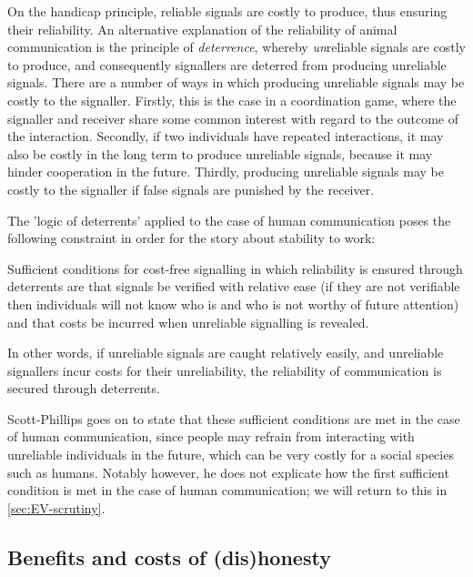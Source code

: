 On the handicap principle, reliable signals are costly to produce, thus ensuring their reliability. An alternative explanation of the reliability of animal communication is the principle of \emph{deterrence}, whereby \emph{un}reliable signals are costly to produce, and consequently signallers are deterred from producing unreliable signals.
There are a number of ways in which producing unreliable signals may be costly to the signaller. Firstly, this is the case in a coordination game, where the signaller and receiver share some common interest with regard to the outcome of the interaction.
Secondly, if two individuals have repeated interactions, it may also be costly in the long term to produce unreliable signals, because it may hinder cooperation in the future.
Thirdly, producing unreliable signals may be costly to the signaller if false signals are punished by the receiver.

The 'logic of deterrents' applied to the case of human communication poses the following constraint  in order for the story about stability to work:
\begin{quoting}
    Sufficient conditions for cost-free signalling in which reliability is ensured through deterrents are that signals be verified with relative ease (if they are not verifiable then individuals will not know who is and who is not worthy of future attention) and that costs be incurred when unreliable signalling is revealed.
    \hfill \citep[p.~?]{Scott-Phillips08}
\end{quoting}
In other words, if unreliable signals are caught relatively easily, and unreliable signallers incur costs for their unreliability, the reliability of communication is secured through deterrents.

Scott-Phillips goes on to state that these sufficient conditions are met in the case of human communication, since people may refrain from interacting with unreliable individuals in the future, which can be very costly for a social species such as humans.
Notably however, he does not explicate how the first sufficient condition is met in the case of human communication; we will return to this in \cref{sec:EV-scrutiny}.


\subsection{Benefits and costs of (dis)honesty}


